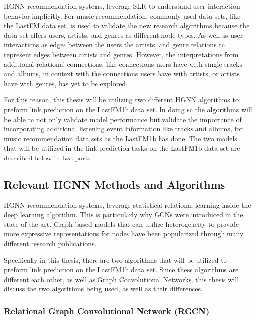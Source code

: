 HGNN recommendation systems, leverage SLR to understand user interaction behavior implicitly. For music recommendation, commonly used data sets, like the LastFM data set, is used to validate the new research algorithms because the data set offers users, artists, and genres as different node types. As well as user interactions as edges between the users the artists, and genre relations to represent edges between artists and genres.\cite{aoscar2010music} However, the interpretations from additional relational connections, like connections users have with single tracks and albums, in context with the connections users have with artists, or artists have with genres, has yet to be explored. 

For this reason, this thesis will be utilizing two different HGNN algorithms to preform link prediction on the LastFM1b data set. In doing so the algorithms will be able to not only validate model performance but validate the importance of incorporating additional listening event information like tracks and albums, for music recommendation data sets as the LastFM1b has done. The two models that will be utilized in the link prediction tasks on the LastFM1b data set are described below in two parts.


\subsection{Relevant HGNN Methods and Algorithms}
HGNN recommendation systems, leverage statistical relational learning inside the deep learning algorithm. This is particularly why GCNs were introduced in the state of the art. Graph based models that can utilize heterogeneity to provide more expressive representations for nodes have been popularized through many different research publications. 


Specifically in this thesis, there are two algorithms that will be utilized to preform link prediction on the LastFM1b data set. Since these algorithms are different each other, as well as Graph Convolutional Networks, this thesis will discuss the two algorithms being used, as well as their differences.


\subsubsection{Relational Graph Convolutional Network (RGCN)}


